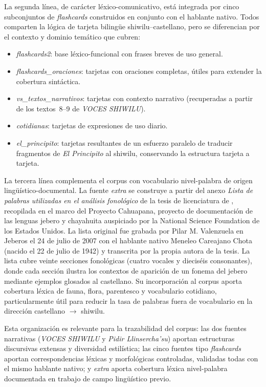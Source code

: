 \documentclass[12pt,a4paper,oneside]{book}
\begin{document}
La segunda línea, de carácter léxico-comunicativo, está integrada por cinco subconjuntos de \emph{flashcards} construidos en conjunto con el hablante nativo. Todos comparten la lógica de tarjeta bilingüe shiwilu--castellano, pero se diferencian por el contexto y dominio temático que cubren:

\begin{itemize}
  \item \emph{flashcards2}: base léxico-funcional con frases breves de uso general.
  \item \emph{flashcards\_oraciones}: tarjetas con oraciones completas, útiles para extender la cobertura sintáctica.
  \item \emph{vs\_textos\_narrativos}: tarjetas con contexto narrativo (recuperadas a partir de los textos~8--9 de \emph{VOCES SHIWILU}).
  \item \emph{cotidianas}: tarjetas de expresiones de uso diario.
  \item \emph{el\_principito}: tarjetas resultantes de un esfuerzo paralelo de traducir fragmentos de \emph{El Principito} al shiwilu, conservando la estructura tarjeta a tarjeta.
\end{itemize}

La tercera línea complementa el corpus con vocabulario nivel-palabra de origen lingüístico-documental. La fuente \emph{extra} se construye a partir del anexo \emph{Lista de palabras utilizadas en el análisis fonológico} de la tesis de licenciatura de \textcite{madalengoitia2014shiwilu}, recopilada en el marco del Proyecto Cahuapana, proyecto de documentación de las lenguas jebero y chayahuita auspiciado por la National Science Foundation de los Estados Unidos. La lista original fue grabada por Pilar M. Valenzuela en Jeberos el 24 de julio de 2007 con el hablante nativo Meneleo Careajano Chota (nacido el 22 de julio de 1942) y transcrita por la propia autora de la tesis. La lista cubre veinte secciones fonológicas (cuatro vocales y dieciséis consonantes), donde cada sección ilustra los contextos de aparición de un fonema del jebero mediante ejemplos glosados al castellano. Su incorporación al corpus aporta cobertura léxica de fauna, flora, parentesco y vocabulario cotidiano, particularmente útil para reducir la tasa de palabras fuera de vocabulario en la dirección castellano $\to$ shiwilu.

Esta organización es relevante para la trazabilidad del corpus: las dos fuentes narrativas (\emph{VOCES SHIWILU} y \emph{Pidir Llinsercha'su}) aportan estructuras discursivas extensas y diversidad estilística; las cinco fuentes tipo \emph{flashcards} aportan correspondencias léxicas y morfológicas controladas, validadas todas con el mismo hablante nativo; y \emph{extra} aporta cobertura léxica nivel-palabra documentada en trabajo de campo lingüístico previo.
\end{document}
